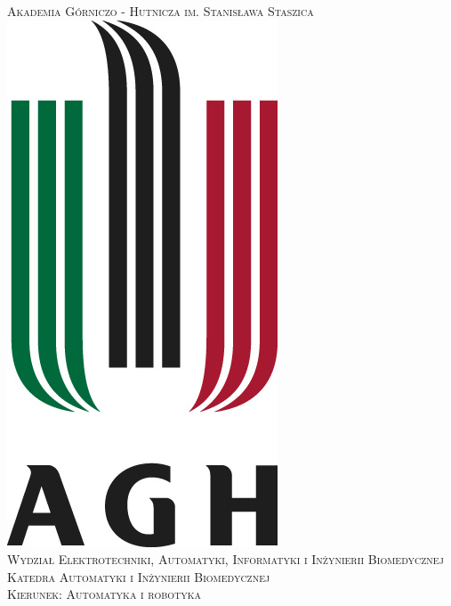 \begin{titlepage}

\newcommand{\HRule}{\rule{\linewidth}{0.5mm}} %

\center %
 

\textsc{\LARGE Akademia Górniczo - Hutnicza im. Stanisława Staszica}\\[0.5cm]
\includegraphics[scale=0.6]{agh}\\[1cm] %
\textsc{\Large Wydział Elektrotechniki, Automatyki, Informatyki i Inżynierii Biomedycznej}\\[0.5cm] %
\textsc{\large Katedra Automatyki i Inżynierii Biomedycznej}\\[0.5cm]
\textsc{ Kierunek: Automatyka i robotyka}\\[0.5cm] %


\end{titlepage}
